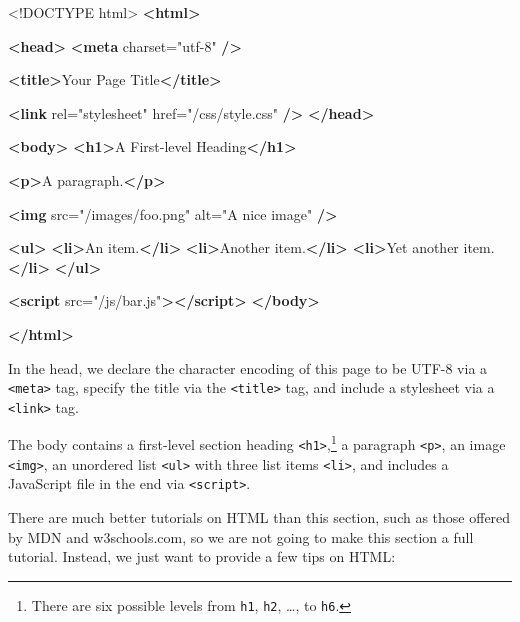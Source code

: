 \documentclass[12pt,]{krantz}
\makeatletter
\newenvironment{Shaded}{\begin{snugshade}}{\end{snugshade}}
\newcommand{\KeywordTok}[1]{\textcolor[rgb]{0.13,0.29,0.53}{\textbf{#1}}}
\newcommand{\DataTypeTok}[1]{\textcolor[rgb]{0.13,0.29,0.53}{#1}}
\newcommand{\StringTok}[1]{\textcolor[rgb]{0.31,0.60,0.02}{#1}}
\newcommand{\OtherTok}[1]{\textcolor[rgb]{0.56,0.35,0.01}{#1}}
\newcommand{\NormalTok}[1]{#1}
\newenvironment{kframe}{%
\medskip{}
\setlength{\fboxsep}{.8em}
 \def\at@end@of@kframe{}%
 \ifinner\ifhmode%
  \def\at@end@of@kframe{\end{minipage}}%
  \begin{minipage}{\columnwidth}%
 \fi\fi%
 \def\FrameCommand##1{\hskip\@totalleftmargin \hskip-\fboxsep
 \colorbox{shadecolor}{##1}\hskip-\fboxsep
     \hskip-\linewidth \hskip-\@totalleftmargin \hskip\columnwidth}%
 \MakeFramed {\advance\hsize-\width
   \@totalleftmargin\z@ \linewidth\hsize
   \@setminipage}}%
 {\par\unskip\endMakeFramed%
 \at@end@of@kframe}
\renewenvironment{Shaded}{\begin{kframe}}{\end{kframe}}
\theoremstyle{definition}
\theoremstyle{definition}
\theoremstyle{definition}
\theoremstyle{remark}
\makeatother
\begin{document}
\begin{Shaded}
\begin{Highlighting}[]
\DataTypeTok{<!DOCTYPE }\NormalTok{html}\DataTypeTok{>}
\KeywordTok{<html>}

  \KeywordTok{<head>}
    \KeywordTok{<meta}\OtherTok{ charset=}\StringTok{"utf-8"} \KeywordTok{/>}
    
    \KeywordTok{<title>}\NormalTok{Your Page Title}\KeywordTok{</title>}
    
    \KeywordTok{<link}\OtherTok{ rel=}\StringTok{"stylesheet"}\OtherTok{ href=}\StringTok{"/css/style.css"} \KeywordTok{/>}
  \KeywordTok{</head>}
  
  \KeywordTok{<body>}
    \KeywordTok{<h1>}\NormalTok{A First-level Heading}\KeywordTok{</h1>}
    
    \KeywordTok{<p>}\NormalTok{A paragraph.}\KeywordTok{</p>}
    
    \KeywordTok{<img}\OtherTok{ src=}\StringTok{"/images/foo.png"}\OtherTok{ alt=}\StringTok{"A nice image"} \KeywordTok{/>}
    
    \KeywordTok{<ul>}
      \KeywordTok{<li>}\NormalTok{An item.}\KeywordTok{</li>}
      \KeywordTok{<li>}\NormalTok{Another item.}\KeywordTok{</li>}
      \KeywordTok{<li>}\NormalTok{Yet another item.}\KeywordTok{</li>}
    \KeywordTok{</ul>}
    
    \KeywordTok{<script}\OtherTok{ src=}\StringTok{"/js/bar.js"}\KeywordTok{></script>}
  \KeywordTok{</body>}

\KeywordTok{</html>}
\end{Highlighting}
\end{Shaded}

In the head, we declare the character encoding of this page to be UTF-8
via a \texttt{\textless{}meta\textgreater{}} tag, specify the title via
the \texttt{\textless{}title\textgreater{}} tag, and include a
stylesheet via a \texttt{\textless{}link\textgreater{}} tag.

The body contains a first-level section heading
\texttt{\textless{}h1\textgreater{}},\footnote{There are six possible
  levels from \texttt{h1}, \texttt{h2}, \ldots{}, to \texttt{h6}.} a
paragraph \texttt{\textless{}p\textgreater{}}, an image
\texttt{\textless{}img\textgreater{}}, an unordered list
\texttt{\textless{}ul\textgreater{}} with three list items
\texttt{\textless{}li\textgreater{}}, and includes a JavaScript file in
the end via \texttt{\textless{}script\textgreater{}}.

There are much better tutorials on HTML than this section, such as those
offered by MDN and w3schools.com, so we are not going to make this
section a full tutorial. Instead, we just want to provide a few tips on
HTML:
\end{document}
